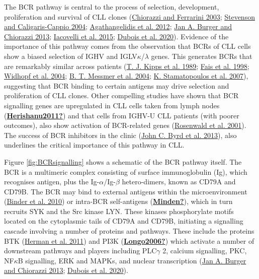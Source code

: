\documentclass[11pt, a4paper, twosided]{book}
\begin{document}
The BCR pathway is central to the process of selection, development, proliferation and survival of CLL clones (\protect\hyperlink{ref-Chiorazzi2003}{Chiorazzi and Ferrarini 2003}; \protect\hyperlink{ref-Stevenson2004}{Stevenson and Caligaris-Cappio 2004}; \protect\hyperlink{ref-Agathangelidis2012}{Agathangelidis et al. 2012}; \protect\hyperlink{ref-Burger2013}{Jan A. Burger and Chiorazzi 2013}; \protect\hyperlink{ref-Iacovelli2015}{Iacovelli et al. 2015}; \protect\hyperlink{ref-Dubois2020}{Dubois et al. 2020}). Evidence of the importance of this pathway comes from the observation that BCRs of CLL cells show a biased selection of IGHV and IGLV\(\kappa\)/\(\lambda\) genes. This generates BCRs that are remarkably similar across patients (\protect\hyperlink{ref-Kipps1989}{T. J. Kipps et al. 1989}; \protect\hyperlink{ref-Fais1998}{Fais et al. 1998}; \protect\hyperlink{ref-Widhopf2004}{Widhopf et al. 2004}; \protect\hyperlink{ref-Messmer2004}{B. T. Messmer et al. 2004}; \protect\hyperlink{ref-Stamatopoulos2007}{K. Stamatopoulos et al. 2007}), suggesting that BCR binding to certain antigens may drive selection and proliferation of CLL clones. Other compelling studies have shown that BCR signalling genes are upregulated in CLL cells taken from lymph nodes (\protect\hyperlink{ref-Herishanu2011}{\textbf{Herishanu2011?}}) and that cells from IGHV-U CLL patients (with poorer outcomes), also show activation of BCR-related genes (\protect\hyperlink{ref-Rosenwald2001}{Rosenwald et al. 2001}). The success of BCR inhibitors in the clinic (\protect\hyperlink{ref-Byrd2013}{John C. Byrd et al. 2013}), also underlines the critical importance of this pathway in CLL.

Figure \ref{fig:BCRsignalling} shows a schematic of the BCR pathway itself. The BCR is a multimeric complex consisting of surface immunoglobulin (Ig), which recognises antigen, plus the Ig-\(\alpha\)/Ig-\(\beta\) hetero-dimers, known as CD79A and CD79B. The BCR may bind to external antigens within the microenvironment (\protect\hyperlink{ref-Binder2010}{Binder et al. 2010}) or intra-BCR self-antigens (\protect\hyperlink{ref-Minden}{\textbf{Minden?}}), which in turn recruits SYK and the Src kinase LYN. These kinases phosphorylate motifs located on the cytoplasmic tails of CD79A and CD79B, initiating a signalling cascade involving a number of proteins and pathways. These include the proteins BTK (\protect\hyperlink{ref-Herman2011}{Herman et al. 2011}) and PI3K (\protect\hyperlink{ref-Longo2006}{\textbf{Longo2006?}}) which activate a number of downstream pathways and players including PLC\(\gamma\) 2, calcium signalling, PKC, NF\(\kappa\)B signalling, ERK and MAPKs, and nuclear transcription (\protect\hyperlink{ref-Burger2013}{Jan A. Burger and Chiorazzi 2013}; \protect\hyperlink{ref-Dubois2020}{Dubois et al. 2020}).
\end{document}
